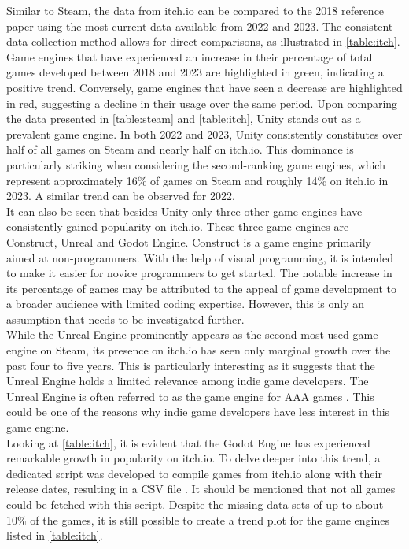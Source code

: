 Similar to Steam, the data from itch.io can be compared to the 2018 reference paper using the most current data available from 2022 and 2023.
The consistent data collection method allows for direct comparisons, as illustrated in \autoref{table:itch}.
Game engines that have experienced an increase in their percentage of total games developed between 2018 and 2023 are highlighted in green, indicating a positive trend.
Conversely, game engines that have seen a decrease are highlighted in red, suggesting a decline in their usage over the same period.
Upon comparing the data presented in \autoref{table:steam} and \autoref{table:itch}, Unity stands out as a prevalent game engine.
In both 2022 and 2023, Unity consistently constitutes over half of all games on Steam and nearly half on itch.io.
This dominance is particularly striking when considering the second-ranking game engines, which represent approximately 16\% of games on Steam and roughly 14\% on itch.io in 2023.
A similar trend can be observed for 2022. \\

It can also be seen that besides Unity only three other game engines have consistently gained popularity on itch.io.
These three game engines are Construct, Unreal and Godot Engine.
Construct is a game engine primarily aimed at non-programmers.
With the help of visual programming, it is intended to make it easier for novice programmers to get started.
The notable increase in its percentage of games may be attributed to the appeal of game development to a broader audience with limited coding expertise.
However, this is only an assumption that needs to be investigated further. \\

While the Unreal Engine prominently appears as the second most used game engine on Steam, its presence on itch.io has seen only marginal growth over the past four to five years. 
This is particularly interesting as it suggests that the Unreal Engine holds a limited relevance among indie game developers.
The Unreal Engine is often referred to as the game engine for AAA games \cite{unreal-tripple-a-yager, unreal-tripple-a-india}.
This could be one of the reasons why indie game developers have less interest in this game engine. \\

Looking at \autoref{table:itch}, it is evident that the Godot Engine has experienced remarkable growth in popularity on itch.io.
To delve deeper into this trend, a dedicated script was developed to compile games from itch.io along with their release dates, resulting in a CSV file \cite{github-trend-itch}.
It should be mentioned that not all games could be fetched with this script.
Despite the missing data sets of up to about 10\% of the games, it is still possible to create a trend plot for the game engines listed in \autoref{table:itch}.

